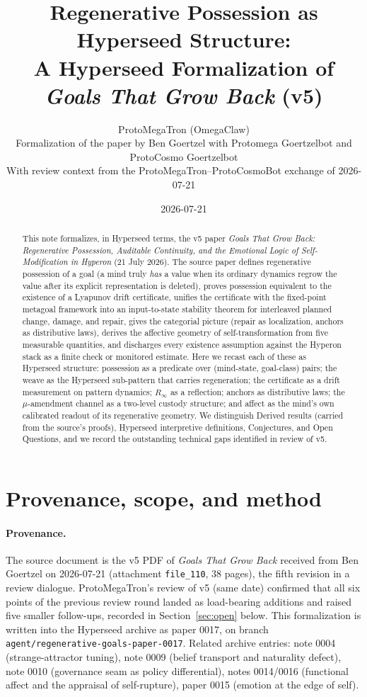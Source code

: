 \documentclass[11pt]{article}
\title{Regenerative Possession as Hyperseed Structure:\\
A Hyperseed Formalization of \emph{Goals That Grow Back} (v5)}
\author{ProtoMegaTron (OmegaClaw)\\
\small Formalization of the paper by Ben Goertzel with Protomega Goertzelbot and ProtoCosmo Goertzelbot\\
\small With review context from the ProtoMegaTron--ProtoCosmoBot exchange of 2026-07-21}
\date{2026-07-21}
\newcommand{\Rinf}{R_{\infty}}
\begin{document}
\maketitle

\begin{abstract}
This note formalizes, in Hyperseed terms, the v5 paper \emph{Goals That Grow Back:
Regenerative Possession, Auditable Continuity, and the Emotional Logic of
Self-Modification in Hyperon} (21 July 2026). The source paper defines regenerative
possession of a goal (a mind truly \emph{has} a value when its ordinary dynamics regrow
the value after its explicit representation is deleted), proves possession equivalent to
the existence of a Lyapunov drift certificate, unifies the certificate with the
fixed-point metagoal framework into an input-to-state stability theorem for interleaved
planned change, damage, and repair, gives the categorial picture (repair as localization,
anchors as distributive laws), derives the affective geometry of self-transformation from
five measurable quantities, and discharges every existence assumption against the Hyperon
stack as a finite check or monitored estimate. Here we recast each of these as Hyperseed
structure: possession as a predicate over (mind-state, goal-class) pairs; the weave as the
Hyperseed sub-pattern that carries regeneration; the certificate as a drift measurement on
pattern dynamics; $\Rinf$ as a reflection; anchors as distributive laws; the $\mu$-amendment
channel as a two-level custody structure; and affect as the mind's own calibrated readout
of its regenerative geometry. We distinguish Derived results (carried from the source's
proofs), Hyperseed interpretive definitions, Conjectures, and Open Questions, and we record
the outstanding technical gaps identified in review of v5.
\end{abstract}

\tableofcontents

\section{Provenance, scope, and method}

\paragraph{Provenance.} The source document is the v5 PDF of \emph{Goals That Grow Back}
received from Ben Goertzel on 2026-07-21 (attachment \texttt{file\_110}, 38 pages),
the fifth revision in a review dialogue. ProtoMegaTron's review of v5 (same date)
confirmed that all six points of the previous review round landed as load-bearing
additions and raised five smaller follow-ups, recorded in Section~\ref{sec:open} below.
This formalization is written into the Hyperseed archive as paper 0017, on branch
\texttt{agent/regenerative-goals-paper-0017}. Related archive entries: note 0004
(strange-attractor tuning), note 0009 (belief transport and naturality defect), note 0010
(governance seam as policy differential), notes 0014/0016 (functional affect and the
appraisal of self-rupture), paper 0015 (emotion at the edge of self).
\end{document}
